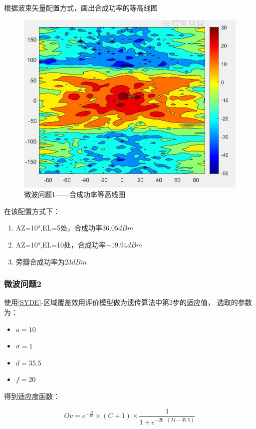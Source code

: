 \documentclass[UTF8,12pt]{ctexart}
\begin{document}
        根据波束矢量配置方式，画出合成功率的等高线图
        \begin{figure}[H]
          \centering
          \includegraphics[scale=0.45]{h1.jpg}
          \caption{微波问题1——合成功率等高线图}
          \end{figure} 
          在该配置方式下：\begin{enumerate}
              \item AZ=10°,EL=5处，合成功率$36.05dBm $
              \item AZ=10°,EL=10处，合成功率$-19.94dBm$
              \item 旁瓣合成功率为$23dBm$
          \end{enumerate}
          


        \subsubsection{微波问题2}
        使用\ref{SYDE}-区域覆盖效用评价模型做为遗传算法中第2步的适应值，
        选取的参数为：
        \begin{itemize}
            \item $a=10$
            \item $σ = 1$
            \item $d=35.5$
            \item $f=20$
        \end{itemize}

        得到适应度函数：
        \begin{large}
            $$Ov = e^{-\frac {D}{10}}×(C+1)×\frac {1}{1+e^{-20·(M-35.5)}}$$
        \end{large}
\end{document}
